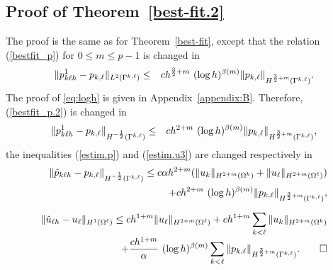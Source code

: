 \documentclass[final]{siamltex}
\begin{document}
\subsection{Proof of Theorem~\ref{best-fit.2}} The proof is the same as
for Theorem~\ref{best-fit}, except that the relation (\ref{bestfit_p})
for $0\le m \le p-1$
is changed in
\begin{eqnarray}\label{eq:logh}
\| p_{k \ell h}^1 - p_{k,\ell} \|_{L^2(\Gamma^{k,\ell})}
&\le& c h^{{3 \over 2}+m}\ (\log h)^{\beta(m)} \| p_{k,\ell} \|_{H^{{3 \over
2}+m}(\Gamma^{k,\ell})}.
\end{eqnarray}
The proof of \eqref{eq:logh} is given in Appendix~\ref{appendix:B}.
Therefore, (\ref{bestfit_p.2}) is changed in
\begin{eqnarray}
\| p_{k \ell h}^1 - p_{k,\ell} \|_{H^{-{1 \over 2}}(\Gamma^{k,\ell})}
&\le& c h^{2+m}\ (\log h)^{\beta(m)}\| p_{k,\ell} \|_{H^{{3 \over
2}+m}(\Gamma^{k,\ell})},
\nonumber
\end{eqnarray}
the inequalities (\ref{estim.p}) and (\ref{estim.u3}) are changed respectively in
\begin{eqnarray}
\| \tilde{p}_{k \ell h} - p_{k,\ell} \|_{H^{-{1 \over 2}}(\Gamma^{k,\ell})}
\le c\alpha h^{2+m}
(\|u_k\|_{H^{2+m}(\Omega^k)}+\|u_{\ell}\|_{H^{2+m}(\Omega^{\ell})})\nonumber \\
  +c h^{2+m} \ (\log h)^{\beta(m)} \| p_{k,\ell} \|_{H^{{3\over
2}+m}(\Gamma^{k,\ell})}, \nonumber\\[2mm]
\| \tilde{u}_{\ell h} - u_{\ell}\|_{H^1(\Omega^{\ell})}
\le c h^{1+m} \|u_{\ell}\|_{H^{2+m}(\Omega^{\ell})}
+ c h^{1+m} \sum_{k < \ell} \|u_k\|_{H^{2+m}(\Omega^k)}\nonumber \\[-1mm]
+{c h^{1+m} \over \alpha} \ (\log h)^{\beta(m)} \sum_{k < \ell} \| p_{k,\ell}
\|_{H^{{3 \over 2}+m}(\Gamma^{k,\ell})}. \qquad \Box
\nonumber
\end{eqnarray}
\end{document}

